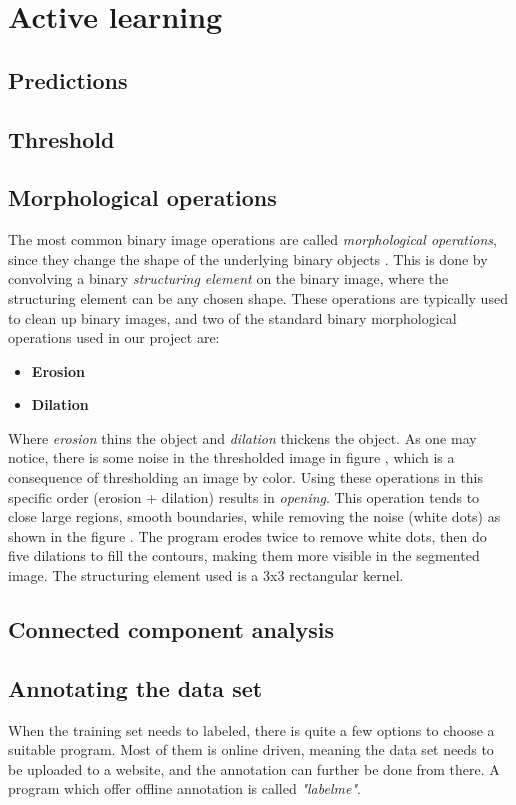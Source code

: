 \documentclass[USenglish]{ifimaster}  %
\begin{document}
\section{Active learning}
\subsection{Predictions}
\subsection{Threshold}
\subsection{Morphological operations}
The most common binary image operations are called \textit{morphological operations}, since
they change the shape of the underlying binary objects \cite{Ritter}. This is done by convolving a binary \textit{structuring element} on the binary image, where the structuring element can be any chosen shape. These operations are typically used to clean up binary images, and two of the standard binary morphological operations used in our project are: 
\begin{itemize}
    \item \textbf{Erosion}
    \item \textbf{Dilation}
\end{itemize}

Where \textit{erosion} thins the object and \textit{dilation} thickens the object. As one may notice, there is some noise in the thresholded image in figure , which is a consequence of thresholding an image by color. Using these operations in this specific order (erosion + dilation) results in \textit{opening}. This operation tends to close large regions, smooth boundaries, while removing the noise (white dots) as shown in the figure . The program erodes twice to remove white dots, then do five dilations to fill the contours, making them more visible in the segmented image. The structuring element used is a 3x3 rectangular kernel.

\subsection{Connected component analysis}
\subsection{Annotating the data set}
When the training set needs to labeled, there is quite a few options to choose a suitable program. Most of them is online driven, meaning the data set needs to be uploaded to a website, and the annotation can further be done from there. A program which offer offline annotation is called \textit{"labelme"}\cite{website:labelme}. 
\end{document}
